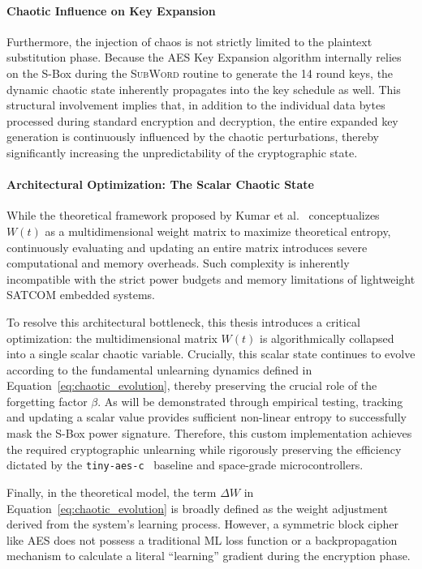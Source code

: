 \documentclass[11pt,a4paper]{report}
\begin{document}
\paragraph{Chaotic Influence on Key Expansion}
Furthermore, the injection of chaos is not strictly limited to the plaintext substitution phase. 
Because the AES Key Expansion algorithm internally relies on the S-Box during the \textsc{SubWord} routine to generate the 14 round keys, the dynamic chaotic state inherently propagates into the key schedule as well. 
This structural involvement implies that, in addition to the individual data bytes processed during standard encryption and decryption, the entire expanded key generation is continuously influenced by the chaotic perturbations, 
thereby significantly increasing the unpredictability of the cryptographic state.

\paragraph{Architectural Optimization: The Scalar Chaotic State}
While the theoretical framework proposed by Kumar et al.~\cite{KumarPaper} conceptualizes $W(t)$ as a multidimensional weight matrix to maximize theoretical entropy, continuously evaluating and updating an entire matrix introduces severe computational and memory overheads. 
Such complexity is inherently incompatible with the strict power budgets and memory limitations of lightweight SATCOM embedded systems.

To resolve this architectural bottleneck, this thesis introduces a critical optimization: the multidimensional matrix $W(t)$ is algorithmically collapsed into a single scalar chaotic variable. 
Crucially, this scalar state continues to evolve according to the fundamental unlearning dynamics defined in Equation~\ref{eq:chaotic_evolution}, thereby preserving the crucial role of the forgetting factor $\beta$.
As will be demonstrated through empirical testing, tracking and updating a scalar value provides sufficient non-linear entropy to successfully mask the S-Box power signature. 
Therefore, this custom implementation achieves the required cryptographic unlearning while rigorously preserving the efficiency dictated by the \texttt{tiny-aes-c}~\cite{tinyAES} baseline and space-grade microcontrollers.

Finally, in the theoretical model, the term $\Delta W$ in Equation~\ref{eq:chaotic_evolution} is broadly defined as the weight adjustment derived from the system's learning process. 
However, a symmetric block cipher like AES does not possess a traditional ML loss function or a backpropagation mechanism to calculate a literal ``learning'' gradient during the encryption phase.
\end{document}
